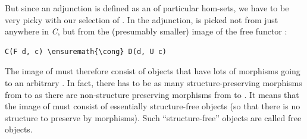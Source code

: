 \begin{figure}[H]
\centering
{}
\end{figure}

\noindent
But since an adjunction is defined as an  of
particular hom-sets, we have to be very picky with our selection of
. In the adjunction,  is picked not
from just anywhere in \emph{C}, but from the (presumably smaller) image
of the free functor :

\begin{Verbatim}[commandchars=\\\{\}]
C(F d, c) \ensuremath{\cong} D(d, U c)
\end{Verbatim}
The image of  must therefore consist of objects that have lots
of morphisms going to an arbitrary . In fact, there has to be
as many structure-preserving morphisms from  to 
as there are non-structure preserving morphisms from  to
. It means that the image of  must consist of
essentially structure-free objects (so that there is no structure to
preserve by morphisms). Such ``structure-free'' objects are called free
objects.

\begin{figure}[H]
\centering
{}
\end{figure}

